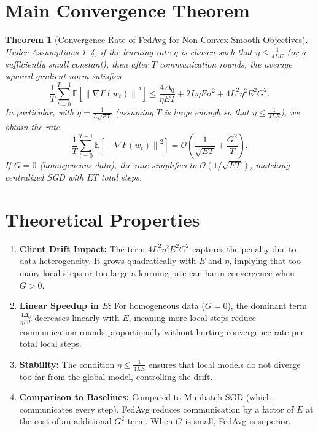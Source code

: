 \documentclass{article}
\newtheorem{theorem}{Theorem}
\newcommand{\norm}[1]{\left\| #1 \right\|}
\begin{document}
\section*{Main Convergence Theorem}
\begin{theorem}[Convergence Rate of FedAvg for Non-Convex Smooth Objectives]
Under Assumptions 1--4, if the learning rate $\eta$ is chosen such that $\eta \le \frac{1}{4LE}$ (or a sufficiently small constant), then after $T$ communication rounds, the average squared gradient norm satisfies
\begin{equation}
    \frac{1}{T} \sum_{t=0}^{T-1} \mathbb{E} \left[ \norm{\nabla F(w_t)}^2 \right] \le \frac{4\Delta_0}{\eta E T} + 2L\eta E \sigma^2 + 4L^2 \eta^2 E^2 G^2.
\end{equation}
In particular, with $\eta = \frac{1}{L\sqrt{E T}}$ (assuming $T$ is large enough so that $\eta \le \frac{1}{4LE}$), we obtain the rate
\begin{equation}
    \frac{1}{T} \sum_{t=0}^{T-1} \mathbb{E} \left[ \norm{\nabla F(w_t)}^2 \right] = \mathcal{O} \left( \frac{1}{\sqrt{E T}} + \frac{G^2}{T} \right).
\end{equation}
If $G=0$ (homogeneous data), the rate simplifies to $\mathcal{O}(1/\sqrt{ET})$, matching centralized SGD with $ET$ total steps.
\end{theorem}

\section*{Theoretical Properties}
\begin{enumerate}
    \item \textbf{Client Drift Impact:} The term $4L^2 \eta^2 E^2 G^2$ captures the penalty due to data heterogeneity. It grows quadratically with $E$ and $\eta$, implying that too many local steps or too large a learning rate can harm convergence when $G>0$.
    \item \textbf{Linear Speedup in $E$:} For homogeneous data ($G=0$), the dominant term $\frac{4\Delta_0}{\eta E T}$ decreases linearly with $E$, meaning more local steps reduce communication rounds proportionally without hurting convergence rate per total local steps.
    \item \textbf{Stability:} The condition $\eta \le \frac{1}{4LE}$ ensures that local models do not diverge too far from the global model, controlling the drift.
    \item \textbf{Comparison to Baselines:} Compared to Minibatch SGD (which communicates every step), FedAvg reduces communication by a factor of $E$ at the cost of an additional $G^2$ term. When $G$ is small, FedAvg is superior.
\end{enumerate}
\end{document}

